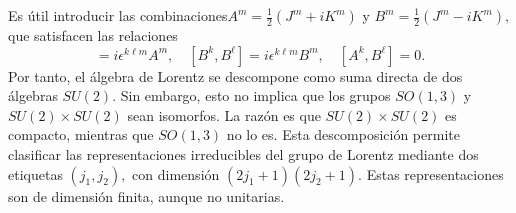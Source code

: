 \documentclass[a4paper,11pt]{book} %
\begin{document}
\medskip\newline
Es útil introducir las combinaciones$A^m=\frac{1}{2}\left(J^m+iK^m\right)$ y $B^m=\frac{1}{2}\left(J^m-iK^m\right),$ que satisfacen las relaciones
\begin{equation}
[A^k,A^\ell]
=
i\epsilon^{k\ell m}A^m,
\quad
[B^k,B^\ell]
=
i\epsilon^{k\ell m}B^m,
\quad
[A^k,B^\ell]
=
0.
\end{equation}
\noindent
Por tanto, el álgebra de Lorentz se descompone como suma directa de dos álgebras \(SU(2)\). Sin embargo, esto no implica que los grupos \(SO(1,3)\) y \(SU(2)\times SU(2)\) sean isomorfos. La razón es que \(SU(2)\times SU(2)\) es compacto, mientras que \(SO(1,3)\) no lo es.
\medskip\newline
Esta descomposición permite clasificar las representaciones irreducibles del grupo de Lorentz mediante dos etiquetas $(j_1,j_2),$ con dimensión $(2j_1+1)(2j_2+1).$ Estas representaciones son de dimensión finita, aunque no unitarias.
\end{document}
